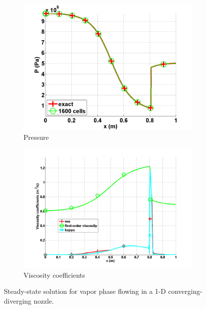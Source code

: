 \begin{figure}[H]
        \begin{subfigure}[b]{0.495\textwidth}
                \centering
                \includegraphics[width=\textwidth]{figures/vapor_pressure_numerical_and_exact_1600.png}
                \caption{Pressure}
                \label{fig:1d_nozzle_vap_press}
        \end{subfigure}

        \begin{subfigure}[b]{0.495\textwidth}
                \centering
                \includegraphics[width=\textwidth]{figures/vapor_viscosity_numerical1600.png}
                \caption{Viscosity coefficients}
                \label{fig:1d_nozzle_vap_visc}
        \end{subfigure}
        \caption{Steady-state solution for vapor phase flowing in a 1-D converging-diverging nozzle.}
				\label{fig:1d_vap_nozzle}
\end{figure}

